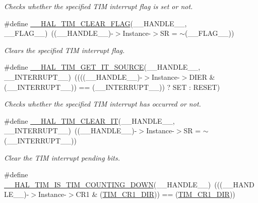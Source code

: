 \begin{DoxyCompactItemize}
\begin{DoxyCompactList}\small\item\em Checks whether the specified T\-I\-M interrupt flag is set or not. \end{DoxyCompactList}\item 
\#define \hyperlink{group___t_i_m___exported___macros_ga2fe74db6b8cb4badd04ed48e0f5ac7b4}{\-\_\-\-\_\-\-H\-A\-L\-\_\-\-T\-I\-M\-\_\-\-C\-L\-E\-A\-R\-\_\-\-F\-L\-A\-G}(\-\_\-\-\_\-\-H\-A\-N\-D\-L\-E\-\_\-\-\_\-, \-\_\-\-\_\-\-F\-L\-A\-G\-\_\-\-\_\-)~((\-\_\-\-\_\-\-H\-A\-N\-D\-L\-E\-\_\-\-\_\-)-\/$>$Instance-\/$>$S\-R = $\sim$(\-\_\-\-\_\-\-F\-L\-A\-G\-\_\-\-\_\-))
\begin{DoxyCompactList}\small\item\em Clears the specified T\-I\-M interrupt flag. \end{DoxyCompactList}\item 
\#define \hyperlink{group___t_i_m___exported___macros_ga644babf93470a6eee6bce8906c4da5c5}{\-\_\-\-\_\-\-H\-A\-L\-\_\-\-T\-I\-M\-\_\-\-G\-E\-T\-\_\-\-I\-T\-\_\-\-S\-O\-U\-R\-C\-E}(\-\_\-\-\_\-\-H\-A\-N\-D\-L\-E\-\_\-\-\_\-, \-\_\-\-\_\-\-I\-N\-T\-E\-R\-R\-U\-P\-T\-\_\-\-\_\-)~((((\-\_\-\-\_\-\-H\-A\-N\-D\-L\-E\-\_\-\-\_\-)-\/$>$Instance-\/$>$D\-I\-E\-R \& (\-\_\-\-\_\-\-I\-N\-T\-E\-R\-R\-U\-P\-T\-\_\-\-\_\-)) == (\-\_\-\-\_\-\-I\-N\-T\-E\-R\-R\-U\-P\-T\-\_\-\-\_\-)) ? S\-E\-T \-: R\-E\-S\-E\-T)
\begin{DoxyCompactList}\small\item\em Checks whether the specified T\-I\-M interrupt has occurred or not. \end{DoxyCompactList}\item 
\#define \hyperlink{group___t_i_m___exported___macros_gaea68155ce77e591e0c2582def061d6f0}{\-\_\-\-\_\-\-H\-A\-L\-\_\-\-T\-I\-M\-\_\-\-C\-L\-E\-A\-R\-\_\-\-I\-T}(\-\_\-\-\_\-\-H\-A\-N\-D\-L\-E\-\_\-\-\_\-, \-\_\-\-\_\-\-I\-N\-T\-E\-R\-R\-U\-P\-T\-\_\-\-\_\-)~((\-\_\-\-\_\-\-H\-A\-N\-D\-L\-E\-\_\-\-\_\-)-\/$>$Instance-\/$>$S\-R = $\sim$(\-\_\-\-\_\-\-I\-N\-T\-E\-R\-R\-U\-P\-T\-\_\-\-\_\-))
\begin{DoxyCompactList}\small\item\em Clear the T\-I\-M interrupt pending bits. \end{DoxyCompactList}\item 
\#define \hyperlink{group___t_i_m___exported___macros_gac73f5e7669d92971830481e7298e98ba}{\-\_\-\-\_\-\-H\-A\-L\-\_\-\-T\-I\-M\-\_\-\-I\-S\-\_\-\-T\-I\-M\-\_\-\-C\-O\-U\-N\-T\-I\-N\-G\-\_\-\-D\-O\-W\-N}(\-\_\-\-\_\-\-H\-A\-N\-D\-L\-E\-\_\-\-\_\-)~(((\-\_\-\-\_\-\-H\-A\-N\-D\-L\-E\-\_\-\-\_\-)-\/$>$Instance-\/$>$C\-R1 \& (\hyperlink{group___peripheral___registers___bits___definition_gacea10770904af189f3aaeb97b45722aa}{T\-I\-M\-\_\-\-C\-R1\-\_\-\-D\-I\-R})) == (\hyperlink{group___peripheral___registers___bits___definition_gacea10770904af189f3aaeb97b45722aa}{T\-I\-M\-\_\-\-C\-R1\-\_\-\-D\-I\-R}))

\end{DoxyCompactItemize}
